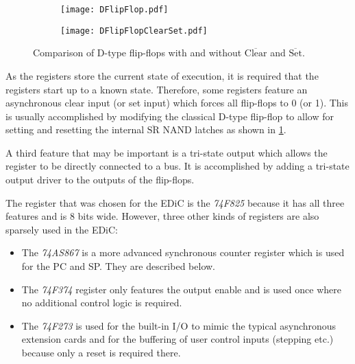 \begin{figure}[t]
  \centering
  \begin{subfigure}[b]{.45\textwidth}
    \texttt{[image: DFlipFlop.pdf]}
  \end{subfigure}%
  \hspace{.05\textwidth}
  \begin{subfigure}[b]{.45\textwidth}
    \texttt{[image: DFlipFlopClearSet.pdf]}
  \end{subfigure}
  \caption{Comparison of D-type flip-flops with and without $\overline{\text{Clear}}$ and $\overline{\text{Set}}$.}
  \label{fig:clearSet}
\end{figure}

As the registers store the current state of execution, it is required that the registers start up to a known state.
Therefore, some registers feature an asynchronous clear input (or set input) which forces all flip-flops to 0 (or 1).
This is usually accomplished by modifying the classical D-type flip-flop to allow for setting and resetting the internal $\overline{\text{SR}}$ NAND latches as shown in \cref{fig:clearSet}.

A third feature that may be important is a tri-state output which allows the register to be directly connected to a bus.
It is accomplished by adding a tri-state output driver to the outputs of the flip-flops.

The register that was chosen for the \gls{EDiC} is the \emph{74F825} because it has all three features and is 8 bits wide.
However, three other kinds of registers are also sparsely used in the \gls{EDiC}:
\begin{itemize}
  \item The \emph{74AS867} is a more advanced synchronous counter register which is used for the \gls{PC} and \gls{SP}. They are described below.
  \item The \emph{74F374} register only features the output enable and is used once where no additional control logic is required.
  \item The \emph{74F273} is used for the built-in I/O to mimic the typical asynchronous extension cards and for the buffering of user control inputs (stepping etc.) because only a reset is required there.
\end{itemize}

